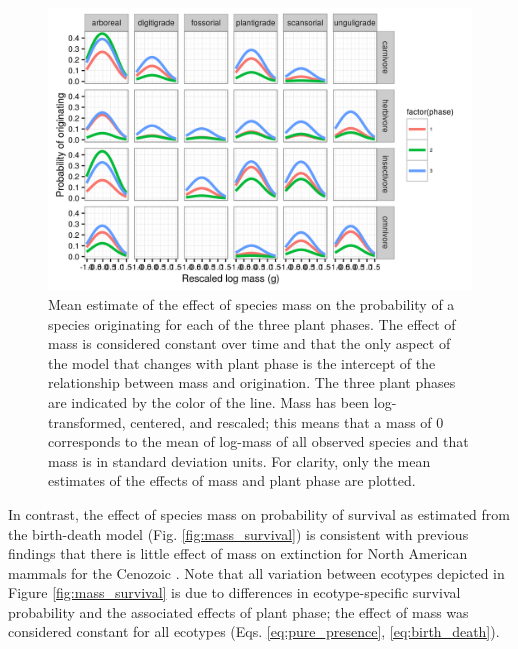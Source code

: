 \documentclass[12pt,letterpaper]{article}
\begin{document}
\begin{figure}[ht]
  \centering
  \includegraphics[width=\textwidth,height=0.4\textheight,keepaspectratio=true]{figure/mass_on_origin_bd}
  \caption[Effect of mass on probability of species origination as estimated from the birth-death model]{Mean estimate of the effect of species mass on the probability of a species originating for each of the three plant phases. The effect of mass is considered constant over time and that the only aspect of the model that changes with plant phase is the intercept of the relationship between mass and origination. The three plant phases are indicated by the color of the line. Mass has been log-transformed, centered, and rescaled; this means that a mass of 0 corresponds to the mean of log-mass of all observed species and that mass is in standard deviation units. For clarity, only the mean estimates of the effects of mass and plant phase are plotted.}
  \label{fig:mass_origin}
\end{figure}



In contrast, the effect of species mass on probability of survival as estimated from the birth-death model (Fig. \ref{fig:mass_survival}) is consistent with previous findings that there is little effect of mass on extinction for North American mammals for the Cenozoic \citep{Smits2015b,Tomiya2013}. Note that all variation between ecotypes depicted in Figure \ref{fig:mass_survival} is due to differences in ecotype-specific survival probability and the associated effects of plant phase; the effect of mass was considered constant for all ecotypes (Eqs. \ref{eq:pure_presence}, \ref{eq:birth_death}).
\end{document}
